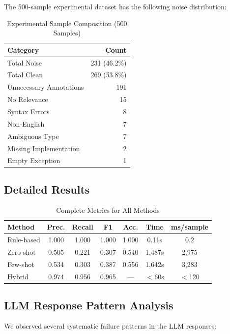 \documentclass[acmlarge,nonacm,screen]{acmart}
\begin{document}
The 500-sample experimental dataset has the following noise distribution:

\begin{table}[htbp]
\caption{Experimental Sample Composition (500 Samples)}
\label{tab:sample-composition}
\begin{tabular}{@{}lr@{}}
\toprule
\textbf{Category} & \textbf{Count} \\
\midrule
Total Noise & 231 (46.2\%) \\
Total Clean & 269 (53.8\%) \\
\midrule
Unnecessary Annotations & 191 \\
No Relevance & 15 \\
Syntax Errors & 8 \\
Non-English & 7 \\
Ambiguous Type & 7 \\
Missing Implementation & 2 \\
Empty Exception & 1 \\
\bottomrule
\end{tabular}
\end{table}

\subsection{Detailed Results}

\begin{table}[htbp]
\caption{Complete Metrics for All Methods}
\label{tab:complete-metrics}
\begin{tabular}{@{}lcccccc@{}}
\toprule
\textbf{Method} & \textbf{Prec.} & \textbf{Recall} & \textbf{F1} & \textbf{Acc.} & \textbf{Time} & \textbf{ms/sample} \\
\midrule
Rule-based & 1.000 & 1.000 & 1.000 & 1.000 & 0.11s & 0.2 \\
Zero-shot & 0.505 & 0.221 & 0.307 & 0.540 & 1,487s & 2,975 \\
Few-shot & 0.534 & 0.303 & 0.387 & 0.556 & 1,642s & 3,283 \\
Hybrid & 0.974 & 0.956 & 0.965 & --- & $<$60s & $<$120 \\
\bottomrule
\end{tabular}
\end{table}

\subsection{LLM Response Pattern Analysis}

We observed several systematic failure patterns in the LLM responses:
\end{document}
